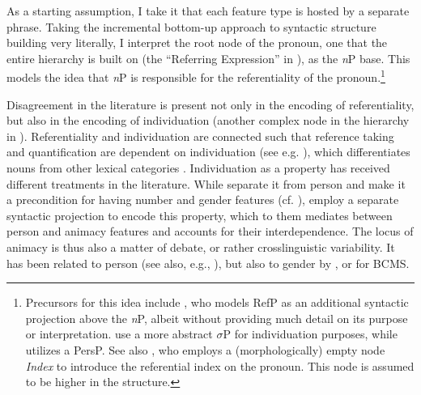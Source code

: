 \documentclass[output=paper,colorlinks,citecolor=brown]{langscibook}
\begin{document}
As a starting assumption, I take it that each feature type is hosted by a separate phrase. Taking the incremental bottom-up approach to syntactic structure building very literally, I interpret the root node of the pronoun, one that the entire hierarchy is built on (the ``Referring Expression'' in ), as the \textit{n}P base. This models the idea that \textit{n}P is responsible for the referentiality of the pronoun.\footnote{Precursors for this idea include \citet{caha21}, who models RefP as an additional syntactic projection above the \textit{n}P, albeit without providing much detail on its purpose or interpretation. \citet{sicheltoosarvandani22} use a more abstract $\sigma$P for individuation purposes, while \citet{ruda21pronounstructure,ruda21sloppy} utilizes a PersP. See also \citet{stegovec19}, who employs a (morphologically) empty node \textit{Index} to introduce the referential index on the pronoun. This node is assumed to be higher in the structure.} 

Disagreement in the literature is present not only in the encoding of referentiality, but also in the encoding of individuation (another complex node in the hierarchy in ). Referentiality and individuation are connected such that reference taking and quantification are dependent on individuation (see e.g. \citealt{sicheltoosarvandani21wccfl}), which differentiates nouns from other lexical categories \citep[94-189]{baker03}. Individuation as a property has received different treatments in the literature. While \citet{harleyritter02} separate it from person and make it a precondition for having number and gender features (cf. ), \citet{sicheltoosarvandani21wccfl,sicheltoosarvandani22} employ a separate syntactic projection to encode this property, which to them mediates between person and animacy features and accounts for their interdependence. The locus of animacy is thus also a matter of debate, or rather crosslinguistic variability. It has been related to person (see also, e.g., \citealt{lochbihleretal21}), but also to gender by \citet{foleytoosarvandani22}, or \citet{puskarsyntax,puskarglossapredicate} for BCMS. 
\end{document}
